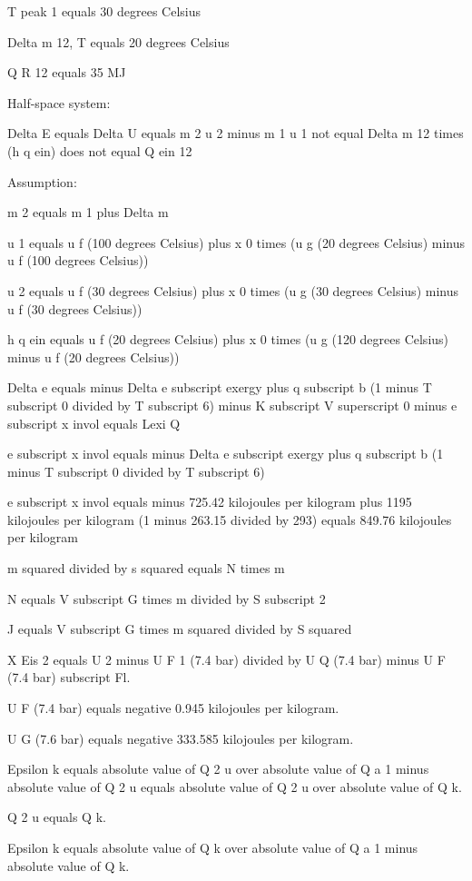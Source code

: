 T peak 1 equals 30 degrees Celsius

Delta m 12, T equals 20 degrees Celsius

Q R 12 equals 35 MJ

Half-space system:

Delta E equals Delta U equals m 2 u 2 minus m 1 u 1 not equal Delta m 12 times (h q ein) does not equal Q ein 12

Assumption:

m 2 equals m 1 plus Delta m

u 1 equals u f (100 degrees Celsius) plus x 0 times (u g (20 degrees Celsius) minus u f (100 degrees Celsius))

u 2 equals u f (30 degrees Celsius) plus x 0 times (u g (30 degrees Celsius) minus u f (30 degrees Celsius))

h q ein equals u f (20 degrees Celsius) plus x 0 times (u g (120 degrees Celsius) minus u f (20 degrees Celsius))

Delta e equals minus Delta e subscript exergy plus q subscript b (1 minus T subscript 0 divided by T subscript 6) minus K subscript V superscript 0 minus e subscript x invol equals Lexi Q  

e subscript x invol equals minus Delta e subscript exergy plus q subscript b (1 minus T subscript 0 divided by T subscript 6)  

e subscript x invol equals minus 725.42 kilojoules per kilogram plus 1195 kilojoules per kilogram (1 minus 263.15 divided by 293) equals 849.76 kilojoules per kilogram  

m squared divided by s squared equals N times m  

N equals V subscript G times m divided by S subscript 2  

J equals V subscript G times m squared divided by S squared

X Eis 2 equals U 2 minus U F 1 (7.4 bar) divided by U Q (7.4 bar) minus U F (7.4 bar) subscript Fl.

U F (7.4 bar) equals negative 0.945 kilojoules per kilogram.

U G (7.6 bar) equals negative 333.585 kilojoules per kilogram.

Epsilon k equals absolute value of Q 2 u over absolute value of Q a 1 minus absolute value of Q 2 u equals absolute value of Q 2 u over absolute value of Q k.

Q 2 u equals Q k.

Epsilon k equals absolute value of Q k over absolute value of Q a 1 minus absolute value of Q k.